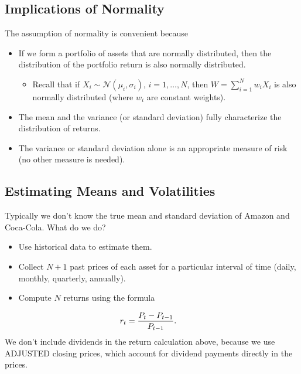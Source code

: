 \documentclass[letterpaper,10pt,english]{sphinxmanual}
\begin{document}
\subsection{Implications of Normality}
\label{risk:implications-of-normality}
The assumption of normality is convenient because
\begin{itemize}
\item {} 
If we form a portfolio of assets that are normally distributed, then
the distribution of the portfolio return is also normally
distributed.
\begin{itemize}
\item {} 
Recall that if $X_i \sim \mathcal{N}(\mu_i, \sigma_i)$,
$i = 1,\ldots,N$, then $W = \sum_{i=1}^N w_i X_i$ is
also normally distributed (where $w_i$ are constant
weights).

\end{itemize}

\end{itemize}
\begin{itemize}
\item {} 
The mean and the variance (or standard deviation) fully characterize
the distribution of returns.

\end{itemize}
\begin{itemize}
\item {} 
The variance or standard deviation alone is an appropriate measure
of risk (no other measure is needed).

\end{itemize}


\subsection{Estimating Means and Volatilities}
\label{risk:estimating-means-and-volatilities}
Typically we don't know the true mean and standard deviation of Amazon
and Coca-Cola.  What do we do?
\begin{itemize}
\item {} 
Use historical data to estimate them.

\end{itemize}
\begin{itemize}
\item {} 
Collect $N+1$ past prices of each asset for a particular
interval of time (daily, monthly, quarterly, annually).

\end{itemize}
\begin{itemize}
\item {} 
Compute $N$ returns using the formula

\end{itemize}
\begin{gather}
\begin{split}r_t & = \frac{P_t - P_{t-1}}{P_{t-1}}.\end{split}\notag
\end{gather}
We don't include dividends in the return calculation above, because we
use ADJUSTED closing prices, which account for dividend payments
directly in the prices.
\end{document}

